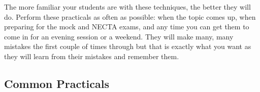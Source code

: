 The more familiar your students are with these techniques, the better they will do.
Perform these practicals as often as possible: when the topic comes up, when preparing
for the mock and NECTA exams, and any time you can get them to come in for an
evening session or a weekend. They will make many, many mistakes the first couple of
times through but that is exactly what you want as they will learn from their mistakes and
remember them.


\subsection{Common Practicals}
